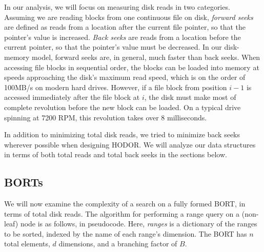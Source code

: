 \documentclass[11pt, oneside]{article}
\newcommand{\ms}{\textit}
\begin{document}
In our analysis, we will focus on measuring disk reads in two categories.
Assuming we are reading blocks from one continuous file on disk, \textit{forward
seeks} are defined as reads from a location after the current file pointer, so
that the pointer's value is increased. \textit{Back seeks} are reads from a
location before the current pointer, so that the pointer's value must be
decreased. In our disk-memory model, forward seeks are, in general, much faster
than back seeks. When accessing file blocks in sequential order, the blocks can
be loaded into memory at speeds approaching the disk's maximum read speed, which
is on the order of 100MB/s on modern hard drives. However, if a file block from
position $i-1$ is accessed immediately after the file block at $i$, the disk
must make most of complete revolution before the new block can be loaded. On a
typical drive spinning at 7200 RPM, this revolution takes over 8 milliseconds.


In addition to minimizing total disk reads, we tried to minimize back seeks
wherever possible when designing HODOR. We will analyze our data structures in
terms of both total reads and total back seeks in the sections below.

\subsection{BORTs}

We will now examine the complexity of a search on a fully formed BORT, in terms
of total disk reads. The algorithm for performing a range query on a (non-leaf)
node is as follows, in pseudocode. Here, \ms{ranges} is a dictionary of the
ranges to be sorted, indexed by the name of each range's dimension. The BORT has
$n$ total elements, $d$ dimensions, and a branching factor of $B$.
\end{document}
